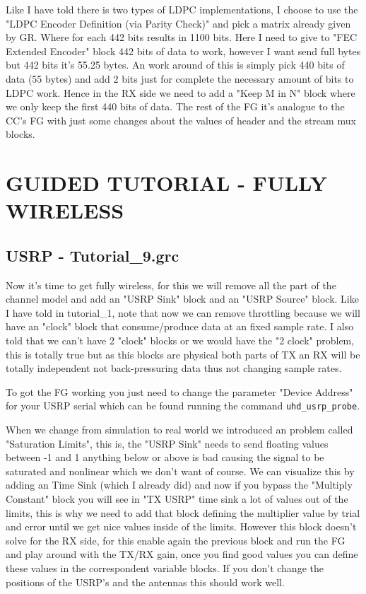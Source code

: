 \documentclass[a4paper, 10pt, conference]{ieeeconf}      %
\begin{document}
    Like I have told there is two types of LDPC implementations, I choose to use the "LDPC Encoder Definition (via Parity Check)" and pick a matrix already given by GR. Where for each 442 bits results in 1100 bits. Here I need to give to "FEC Extended Encoder" block 442 bits of data to work, however I want send full bytes but 442 bits it's 55.25 bytes. An work around of this is simply pick 440 bits of data (55 bytes) and add 2 bits just for complete the necessary amount of bits to LDPC work. Hence in the RX side we need to add a "Keep M in N" block where we only keep the first 440 bits of data. The rest of the FG it's analogue to the CC's FG with just some changes about the values of header and the stream mux blocks.
    
\section{GUIDED TUTORIAL - FULLY WIRELESS}
\subsection{USRP - Tutorial\_9.grc}
    Now it's time to get fully wireless, for this we will remove all the part of the channel model and add an "USRP Sink" block and an "USRP Source" block. Like I have told in tutorial\_1, note that now we can remove throttling because we will have an "clock" block that consume/produce data at an fixed sample rate. I also told that we can't have 2 "clock" blocks or we would have the "2 clock" problem, this is totally true but as this blocks are physical both parts of TX an RX will be totally independent not back-pressuring data thus not changing sample rates.
    
    To got the FG working you just need to change the parameter "Device Address" for your USRP serial which can be found running the command \verb|uhd_usrp_probe|. 
    
    When we change from simulation to real world we introduced an problem called "Saturation Limits", this is, the "USRP Sink" needs to send floating values between -1 and 1 anything below or above is bad causing the signal to be saturated and nonlinear which we don't want of course. We can visualize this by adding an Time Sink (which I already did) and now if you bypass the "Multiply Constant" block you will see in "TX USRP" time sink a lot of values out of the limits, this is why we need to add that block defining the multiplier value by trial and error until we get nice values inside of the limits. However this block doesn't solve for the RX side, for this enable again the previous block and run the FG and play around with the TX/RX gain, once you find good values you can define these values in the correspondent variable blocks. If you don't change the positions of the USRP's and the antennas this should work well.
    
\end{document}
